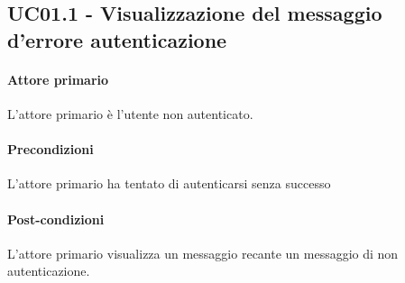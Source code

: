 \subsection{UC01.1 - Visualizzazione del messaggio d'errore autenticazione}\label{uc:1.1}

\paragraph{Attore primario} L'attore primario è l'utente non autenticato.

\paragraph{Precondizioni} L'attore primario ha tentato di autenticarsi senza successo

\paragraph{Post-condizioni} L'attore primario visualizza un messaggio recante un messaggio di non autenticazione.